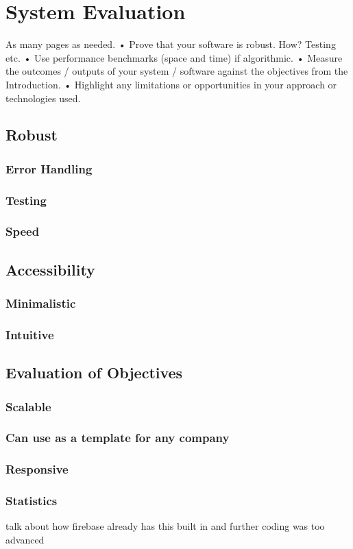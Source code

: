 \chapter{System Evaluation}


As many pages as needed.
• Prove that your software is robust. How? Testing etc.
• Use performance benchmarks (space and time) if algorithmic.
• Measure the outcomes / outputs of your system / software against the
objectives from the Introduction.
• Highlight any limitations or opportunities in your approach or technologies
used.

\section{Robust}
\subsection{Error Handling}
\subsection{Testing}
\subsection{Speed}

\section{Accessibility}
\subsection{Minimalistic}
\subsection{Intuitive}

\section{Evaluation of Objectives}
\subsection{Scalable}
\subsection{Can use as a template for any company}
\subsection{Responsive}
\subsection{Statistics}
talk about how firebase already has this built in and further coding was too advanced